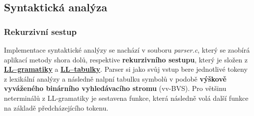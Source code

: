 \documentclass[a4paper, 12pt]{article} %
\begin{document}

        \subsection{Syntaktická analýza}\label{syntactics}
            \subsubsection{Rekurzivní sestup}
                Implementace syntaktické analýzy se nachází v souboru \textit{parser.c}, který se
                zaobírá aplikací metody shora dolů, respektive \textbf{rekurzivního sestupu}, který
                je složen z \hyperref[llgramatika]{\textbf{LL--gramatiky}} a
                \hyperref[lltabulka]{\textbf{LL--tabulky}}. Parser si jako svůj vstup bere jednotlivé
                tokeny z lexikální analýzy a následně nalpní tabulku symbolů v podobě \textbf{výškově
                vyváženého binárního vyhledávacího stromu} (vv-BVS). Pro většinu neterminálů z
                LL-gramatiky je sestavena funkce, která následně volá další funkce na základě
                předcházejícího tokenu.
\end{document}
